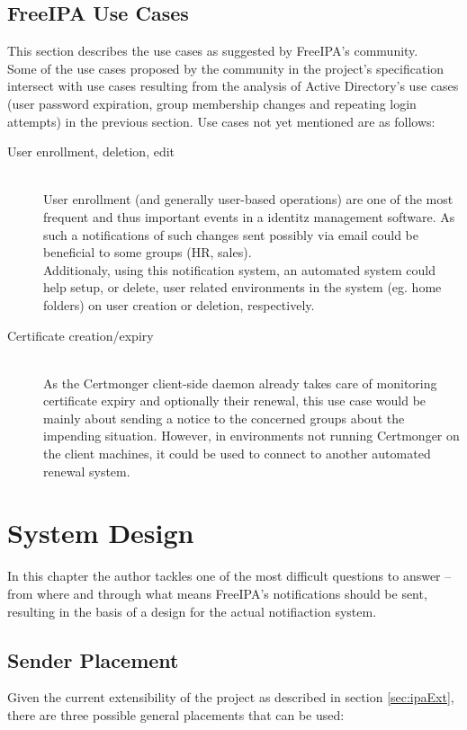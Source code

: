 \section{FreeIPA Use Cases}
This section describes the use cases as suggested by FreeIPA's community. \\
Some of the use cases proposed by the community in the project's specification intersect with use cases resulting from the analysis of Active Directory's use cases (user password expiration, group membership changes and repeating login attempts) in the previous section.
Use cases not yet mentioned are as follows:
\begin{description}
    \item[User enrollment, deletion, edit]\hfill \\
        User enrollment (and generally user-based operations) are one of the most frequent and thus important events in a identitz management software.
        As such a notifications of such changes sent possibly via email could be beneficial to some groups (HR, sales). \\
        Additionaly, using this notification system, an automated system could help setup, or delete, user related environments in the system (eg. home folders) on user creation or deletion, respectively.
    \item[Certificate creation/expiry]\hfill \\
        As the Certmonger client-side daemon already takes care of monitoring certificate expiry and optionally their renewal, this use case would be mainly about sending a notice to the concerned groups
        about the impending situation. However, in environments not running Certmonger on the client machines, it could be used to connect to another automated renewal system.
\end{description}

\chapter{System Design}
\label{chp:appDesign}
In this chapter the author tackles one of the most difficult questions to answer -- from where and through what means FreeIPA's notifications should be sent, resulting in the basis of a design for the actual notifiaction system.
\section{Sender Placement}
Given the current extensibility of the project as described in section \ref{sec:ipaExt},
there are three possible general placements that can be used:

